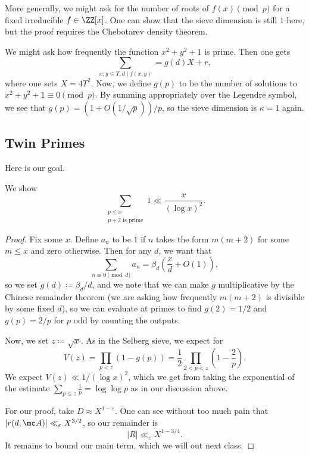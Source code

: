 \documentclass[../notes.tex]{subfiles}
\begin{document}
\begin{remark}
	More generally, we might ask for the number of roots of $f(x)\pmod p$ for a fixed irreducible $f\in\ZZ[x]$. One can show that the sieve dimension is still $1$ here, but the proof requires the Chebotarev density theorem.
\end{remark}
\begin{example}
	We might ask how frequently the function $x^2+y^2+1$ is prime. Then one gets
	\[\sum_{x,y\le T,d\mid f(x,y)}=g(d)X+r,\]
	where one sets $X=4T^2$. Now, we define $g(p)$ to be the number of solutions to $x^2+y^2+1\equiv0\pmod p$. By summing appropriately over the Legendre symbol, we see that $g(p)=(1+O(1/\sqrt p))/p$, so the sieve dimension is $\kappa=1$ again.
\end{example}

\subsection{Twin Primes}
Here is our goal.
\begin{theorem}
	We show
	\[\sum_{\substack{p\le x\\p+2\text{ is prime}}}1\ll\frac x{(\log x)^2}.\]
\end{theorem}
\begin{proof}
	Fix some $x$. Define $a_n$ to be $1$ if $n$ takes the form $m(m+2)$ for some $m\le x$ and zero otherwise. Then for any $d$, we want that
	\[\sum_{n\equiv0\pmod d}a_n=\beta_d\left(\frac xd+O(1)\right),\]
	so we set $g(d)\coloneqq\beta_d/d$, and we note that we can make $g$ multiplicative by the Chinese remainder theorem (we are asking how frequently $m(m+2)$ is divisible by some fixed $d$), so we can evaluate at primes to find $g(2)=1/2$ and $g(p)=2/p$ for $p$ odd by counting the outputs.

	Now, we set $z\coloneqq\sqrt x$. As in the Selberg sieve, we expect for
	\[V(z)=\prod_{p<z}(1-g(p))=\frac12\prod_{2<p<z}\left(1-\frac2p\right).\]
	We expect $V(z)\ll1/(\log x)^2$, which we get from taking the exponential of the estimate $\sum_{p\le z}\frac1p=\log\log p$ as in our discussion above.

	For our proof, take $D\approx X^{1-\varepsilon}$. One can see without too much pain that $|r(d,\mc A)|\ll_\varepsilon X^{3/2}$, so our remainder is
	\[|R|\ll_\varepsilon X^{1-3/4}.\]
	It remains to bound our main term, which we will out next class.
\end{proof}
\end{document}
